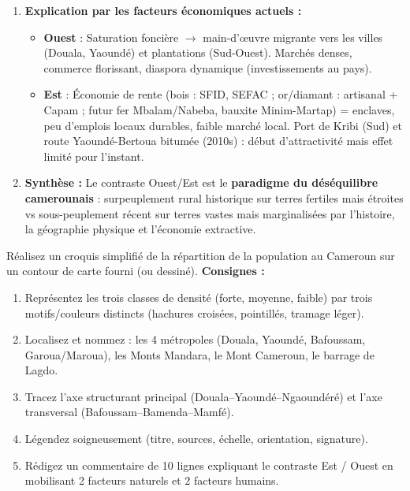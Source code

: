 \documentclass[11pt]{article}
\begin{document}
\begin{exoresolu}
\begin{enumerate}
\begin{itemize}
      \item \textbf{Est} : Peuplement tardif et diffus (Bantous Makaa, Kako, Pygmées Baka/Bakola). Traite négrière (razzias depuis le Nord via Adamaoua par les Peuls). Colonisation : exploitation forestière/minière sans peuplement (concessions, camps temporaires, chemin de fer Douala-Ngaoundéré bypassant l'Est). Indépendance : isolement routier (piste jusqu'aux années 2000), absence de pôle urbain fort.
      \end{itemize}
\item \textbf{Explication par les facteurs économiques actuels :}
      \begin{itemize}
      \item \textbf{Ouest} : Saturation foncière $\rightarrow$ main-d'œuvre migrante vers les villes (Douala, Yaoundé) et plantations (Sud-Ouest). Marchés denses, commerce florissant, diaspora dynamique (investissements au pays).
      \item \textbf{Est} : Économie de rente (bois : SFID, SEFAC ; or/diamant : artisanal + Capam ; futur fer Mbalam/Nabeba, bauxite Minim-Martap) = enclaves, peu d'emplois locaux durables, faible marché local. Port de Kribi (Sud) et route Yaoundé-Bertoua bitumée (2010s) : début d'attractivité mais effet limité pour l'instant.
      \end{itemize}
\item \textbf{Synthèse :} Le contraste Ouest/Est est le \textbf{paradigme du déséquilibre camerounais} : surpeuplement rural historique sur terres fertiles mais étroites vs sous-peuplement récent sur terres vastes mais marginalisées par l'histoire, la géographie physique et l'économie extractive.
\end{enumerate}
\end{exoresolu}

\begin{exercice}
Réalisez un croquis simplifié de la répartition de la population au Cameroun sur un contour de carte fourni (ou dessiné).
\textbf{Consignes :}
\begin{enumerate}
\item Représentez les trois classes de densité (forte, moyenne, faible) par trois motifs/couleurs distincts (hachures croisées, pointillés, tramage léger).
\item Localisez et nommez : les 4 métropoles (Douala, Yaoundé, Bafoussam, Garoua/Maroua), les Monts Mandara, le Mont Cameroun, le barrage de Lagdo.
\item Tracez l'axe structurant principal (Douala--Yaoundé--Ngaoundéré) et l'axe transversal (Bafoussam--Bamenda--Mamfé).
\item Légendez soigneusement (titre, sources, échelle, orientation, signature).
\item Rédigez un commentaire de 10 lignes expliquant le contraste Est / Ouest en mobilisant 2 facteurs naturels et 2 facteurs humains.
\end{enumerate}
\end{exercice}
\end{document}
